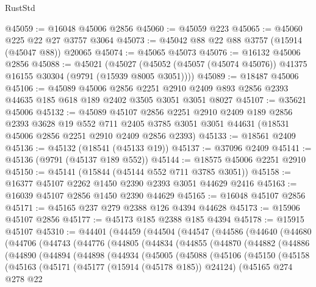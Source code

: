 \begin{lexlean}{RustStd}
\begin{coremodule}
@45059 := @16048 @45006 @2856
@45060 := @45059 @223
@45065 := @45060 @225 @22 @27 @3757 @3064
@45073 := @45042 @88 @22 @88 @3757 (@15914 (@45047 @88)) @20065
@45074 := @45065 @45073
@45076 := @16132 @45006 @2856
@45088 := @45021
    (@45027 (@45052 (@45057 (@45074 @45076)) @41375 @16155 @30304 (@9791 (@15939 @8005 @3051))))
@45089 := @18487 @45006
@45106 := @45089
    @45006
    @2856
    @2251
    @2910
    @2409
    @893
    @2856
    @2393
    @44635
    @185
    @618
    @189
    @2402
    @3505
    @3051
    @3051
    @8027
@45107 := @35621 @45006
@45132 := @45089
    @45107
    @2856
    @2251
    @2910
    @2409
    @189
    @2856
    @2393
    @3628
    @19
    @552
    @711
    @2405
    @3785
    @3051
    @3051
    @44631
    (@18531 @45006 @2856 @2251 @2910 @2409 @2856 @2393)
@45133 := @18561 @2409
@45136 := @45132 (@18541 (@45133 @19))
@45137 := @37096 @2409
@45141 := @45136 (@9791 (@45137 @189 @552))
@45144 := @18575 @45006 @2251 @2910
@45150 := @45141 (@15844 (@45144 @552 @711 @3785 @3051))
@45158 := @16377 @45107 @2262 @1450 @2390 @2393 @3051 @44629 @2416
@45163 := @16039 @45107 @2856 @1450 @2390 @44629
@45165 := @16048 @45107 @2856
@45171 := @45165 @237 @279 @2388 @126 @4394 @44628
@45173 := @15906 @45107 @2856
@45177 := @45173 @185 @2388 @185 @4394
@45178 := @15915 @45107
@45310 := @44401
    (@44459
      (@44504
        (@44547
          (@44586
            (@44640
              (@44680
                (@44706
                  (@44743
                    (@44776
                      (@44805
                        (@44834
                          (@44855
                            (@44870
                              (@44882
                                (@44886
                                  (@44890
                                    (@44894
                                      (@44898
                                        (@44934
                                          (@45005
                                            (@45088
                                              (@45106
                                                (@45150
                                                  (@45158
                                                    (@45163
                                                      (@45171
                                                        (@45177 (@15914 (@45178 @185)) @24124)
                                                        (@45165
                                                          @274
                                                          @278
                                                          @22

\end{coremodule}
\end{lexlean}

